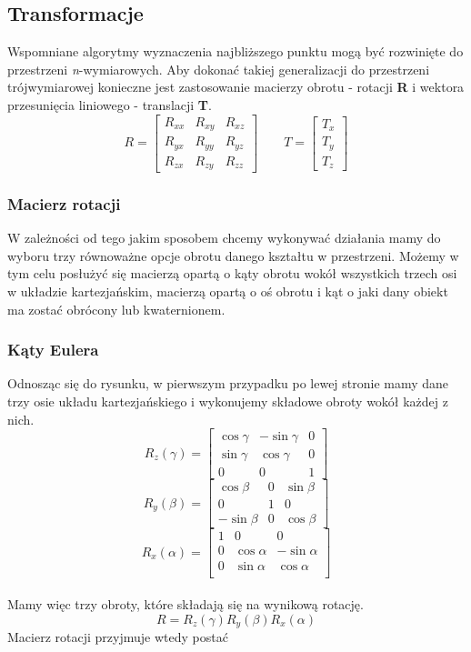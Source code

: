 \documentclass[12pt]{article}
\begin{document}
\subsection{Transformacje}
Wspomniane algorytmy wyznaczenia najbliższego punktu mogą być rozwinięte do przestrzeni \emph{n}-wymiarowych. Aby dokonać takiej generalizacji do przestrzeni trójwymiarowej konieczne jest zastosowanie macierzy obrotu - rotacji \textbf{R} i wektora przesunięcia liniowego - translacji \textbf{T}.
\[
R = \begin{bmatrix}
R_{xx} & R_{xy} & R_{xz} \\
R_{yx} & R_{yy} & R_{yz} \\
R_{zx} & R_{zy} & R_{zz}
\end{bmatrix}
\qquad
T = \begin{bmatrix}
T_{x} \\ T_{y} \\ T_{z}
\end{bmatrix}
\]

\subsubsection{Macierz rotacji}
W zależności od tego jakim sposobem chcemy wykonywać działania mamy do wyboru trzy równoważne opcje obrotu danego kształtu w przestrzeni. Możemy w tym celu posłużyć się macierzą opartą o kąty obrotu wokół wszystkich trzech osi w układzie kartezjańskim, macierzą opartą o oś obrotu i kąt o jaki dany obiekt ma zostać obrócony lub kwaternionem.

\subsubsection{Kąty Eulera}
Odnosząc się do rysunku, w pierwszym przypadku po lewej stronie mamy dane trzy osie układu kartezjańskiego i wykonujemy składowe obroty wokół każdej z nich. 
\[
R_{z}(\gamma) = \begin{bmatrix}
\cos \gamma & -\sin \gamma & 0 \\
\sin \gamma & \cos \gamma & 0 \\
0 & 0 & 1
\end{bmatrix}
\]
\[
R_{y}(\beta) = \begin{bmatrix}
\cos \beta & 0 & \sin \beta \\
0 & 1 & 0 \\
-\sin \beta & 0 & \cos \beta
\end{bmatrix}
\]
\[
R_{x}(\alpha) = \begin{bmatrix}
1 & 0 & 0 \\
0 & \cos \alpha & -\sin \alpha \\
0 & \sin \alpha & \cos \alpha \\
\end{bmatrix}
\]
\\
Mamy więc trzy obroty, które składają się na wynikową rotację.
\\
\[R = R_{z}(\gamma)R_{y}(\beta)R_{x}(\alpha)\]
Macierz rotacji przyjmuje wtedy postać
\end{document}

